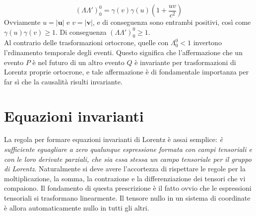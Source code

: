 \documentclass[a4paper,11pt]{book}
\theoremstyle{plain}
\theoremstyle{definition}
\begin{document}
\begin{enumerate}[i.]
	\[
	(\Lambda\Lambda')_0^0 = \gamma(v)\gamma(u) \left( 1+\frac{uv}{c^2} \right)
	\] 
Ovviamente $u = |\textbf{u}|$ e $v = |\textbf{v}|$, e di conseguenza sono entrambi positivi, così come $\gamma(u)\gamma(v) \geq 1$. Di conseguenza $	(\Lambda\Lambda')_0^0 \geq 1$. \\
Al contrario delle trasformazioni ortocrone, quelle con $\Lambda_0^0<1$ invertono l'rdinamento temporale degli eventi. Questo significa che l'affermazione che un evento $P$ è nel futuro di un altro evento $Q$ è invariante per trasformazioni di Lorentz proprie ortocrone, e tale affermazione è di fondamentale importanza per far sì che la causalità risulti invariante. 
\end{enumerate}

\section{Equazioni invarianti}
La regola per formare equazioni invarianti di Lorentz è assai semplice: \emph{è sufficiente eguagliare a zero qualunque espressione formata con campi tensoriali e con le loro derivate parziali, che sia essa stessa un campo tensoriale per il gruppo di Lorentz}. Naturalmente si deve avere l'accortezza di rispettare le regole per la moltiplicazione, la somma, la 
contrazione e la differenziazione dei tensori che vi compaiono. Il fondamento di questa 
prescrizione è il fatto ovvio che le espressioni tensoriali si trasformano linearmente. Il 
tensore nullo in un sistema di coordinate è allora automaticamente nullo in tutti gli altri. 
\end{document}
